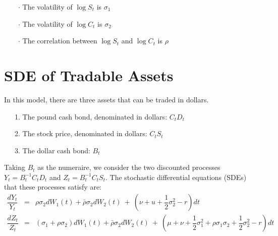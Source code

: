 \documentclass[uplatex,a4j,12pt,dvipdfmx]{jsarticle}
\begin{document}
\ \ \ \ $\cdot$ The volatility of $\log S_{t}$ is $\sigma_{1}$

\ \ \ \ $\cdot$ The volatility of $\log C_{t}$ is $\sigma_{2}$

\ \ \ \ $\cdot$ The correlation between $\log S_{t}$ and $\log C_{t}$ is $\rho$

\section{SDE of Tradable Assets}

In this model, there are three assets that can be traded in dollars.

\ \ \ 1. The pound cash bond, denominated in dollars: $C_{t} D_{t}$

\ \ \ 2. The stock price, denominated in dollars: $C_{t} S_{t}$

\ \ \ 3. The dollar cash bond: $B_{t}$

Taking $B_{t}$ as the numeraire, we consider the two discounted processes
$Y_{t} = B_{t}^{-1} C_{t} D_{t}$ and
$Z_{t} = B_{t}^{-1} C_{t} S_{t}$.
The stochastic differential equations (SDEs) that these processes satisfy are:
%
%
\begin{eqnarray}
	\dfrac{dY_{t}}{Y_{t}}
	&=&
	\rho \sigma_{2} dW_{1}(t) +
	\bar{\rho} \sigma_{2} dW_{2}(t) \ + \ \left( \nu + u + \dfrac{1}{2} \sigma_{2}^{2} - r \right) dt
	\\
	\dfrac{dZ_{t}}{Z_{t}}
	&=&
	(\sigma_{1} + \rho \sigma_{2}) dW_{1}(t)
	+ \bar{\rho} \sigma_{2} dW_{2}(t)
	\ + \
	\left(
	\mu + \nu +
	\dfrac{1}{2} \sigma_{1}^{2} + \rho \sigma_{1} \sigma_{2} + \dfrac{1}{2} \sigma_{2}^{2}
	- r
	\right) dt
\end{eqnarray}
%
%
\end{document}
